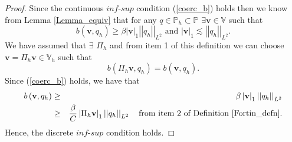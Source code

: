\documentclass[12pt,a4paper]{article}
\theoremstyle{definition}
\begin{document}
\begin{proof}
	Since the continuous $\textit{inf-sup}$ condition (\ref{coerc_b}) holds then we know from Lemma \ref{Lemma_equiv} that for any $q\in \mathbb{P}_h \subset \mathbb{P}$ $\exists \textbf{v}\in \mathbb{V}$ such that
	\begin{equation}
		b\left(\textbf{v}, q_h\right)\geq \beta \left|\textbf{v}\right|_1\left|\left|q_h\right|\right|_{L^2} \text{ and } \left|\textbf{v}\right|_1 \lesssim \left|\left|q_h\right|\right|_{L^2}. \nonumber
	\end{equation} 
We have assumed that $\exists$ $\Pi_h$ and from item 1 of this definition we can choose $\textbf{v}=\Pi_h \textbf{v}\in \mathbb{V}_h$ such that
\begin{equation}
	b\left(\Pi_h\textbf{v},q_h\right) =b \left(\textbf{v},q_h\right). \nonumber
\end{equation}
Since (\ref{coerc_b}) holds, we have that
\begin{eqnarray}
b \left(\textbf{v},q_h\right)&\geq& \beta \left|\textbf{v}\right|_1\left|\left|q_h\right|\right|_{L^2} \nonumber \\
&\geq& \frac{\beta}{C} \left|\Pi_h\textbf{v}\right|_1\left|\left|q_h\right|\right|_{L^2}\quad \text{from item 2 of Definition \ref{Fortin_defn}}. \nonumber
\end{eqnarray}
Hence, the discrete $\textit{inf-sup}$ condition holds.
\end{proof}
\end{document}
